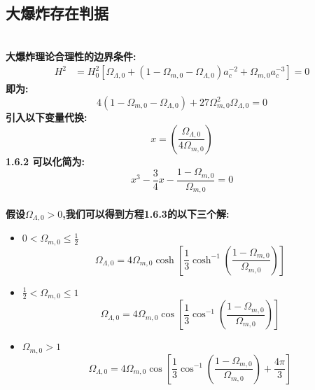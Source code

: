 \documentclass[14pt]{article}
\begin{document}
\subsection{大爆炸存在判据}
\quad\\
\textbf{大爆炸理论合理性的边界条件:}\cite{GRAIfPh1}
\begin{align*}
H^{2}&=H^{2}_{0}[\Omega_{\Lambda,0}+(1-\Omega_{m,0}-\Omega_{\Lambda,0})a^{-2}_{c}+\Omega_{m,0}a^{-3}_{c}]=0\tag{1.6.1}
\end{align*}
\textbf{即为:}
\[
4(1-\Omega_{m,0}-\Omega_{\Lambda,0})+27\Omega_{m,0}^{2}\Omega_{\Lambda,0}=0\tag{1.6.2}
\]
\textbf{引入以下变量代换:}
\[
x=\displaystyle(\frac{\Omega_{\Lambda,0}}{4\Omega_{m,0}})\tag{1.6.3}
\]
\textbf{1.6.2 可以化简为:}
\[
x^{3}-\frac{3}{4}x-\frac{1-\Omega_{m,0}}{\Omega_{m,0}}=0\tag{1.6.4}
\]
\quad\\
\textbf{假设$\Omega_{\Lambda,0}>0$,我们可以得到方程1.6.3的以下三个解:}

\begin{itemize}
    \item $0<\Omega_{m,0}\le \displaystyle\frac{1}{2}$\\
    \[\Omega_{\Lambda,0}=4\Omega_{m,0}\cosh[\frac{1}{3}\cosh^{-1}(\frac{1-\Omega_{m,0}}{\Omega_{m,0}})]\tag{1.6.5}\]
    \item $\displaystyle\frac{1}{2}<\Omega_{m,0}\le 1$\\
     \[\Omega_{\Lambda,0}=4\Omega_{m,0}\cos[\frac{1}{3}\cos^{-1}(\frac{1-\Omega_{m,0}}{\Omega_{m,0}})]\tag{1.6.6}\]
    \item $\Omega_{m,0}> 1$\\
    \[\Omega_{\Lambda,0}=4\Omega_{m,0}\cos[\frac{1}{3}\cos^{-1}(\frac{1-\Omega_{m,0}}{\Omega_{m,0}})+\frac{4\pi}{3}]\tag{1.6.7}\]
\end{itemize}
\end{document}
